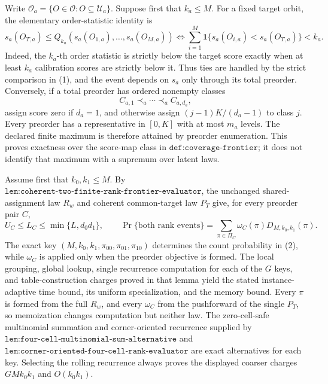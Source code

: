 Write \(\mathcal O_a=\{O\in\mathcal O:O\subseteq\mathcal U_a\}\). Suppose first that \(k_a\le M\). For a fixed target orbit, the elementary order-statistic identity is
\[
s_a(O_{T,a})
\le
Q_{k_a}(s_a(O_{1,a}),\ldots,s_a(O_{M,a}))
\Longleftrightarrow
\sum_{i=1}^M
\mathbf 1\{s_a(O_{i,a})<s_a(O_{T,a})\}
<k_a.
\tag{1}
\]
Indeed, the \(k_a\)-th order statistic is strictly below the target score exactly when at least \(k_a\) calibration scores are strictly below it. Thus ties are handled by the strict comparison in (1), and the event depends on \(s_a\) only through its total preorder. Conversely, if a total preorder has ordered nonempty classes
\[
C_{a,1}\prec_a\cdots\prec_a C_{a,d_a},
\]
assign score zero if \(d_a=1\), and otherwise assign \((j-1)K/(d_a-1)\) to class \(j\). Every preorder has a representative in \([0,K]\) with at most \(m_a\) levels. The declared finite maximum is therefore attained by preorder enumeration. This proves exactness over the score-map class in \(\texttt{def:coverage-frontier}\); it does not identify that maximum with a supremum over latent laws.

Assume first that \(k_0,k_1\le M\). By \(\texttt{lem:coherent-two-finite-rank-frontier-evaluator}\), the unchanged shared-assignment law \(R_w\) and coherent common-target law \(P_T\) give, for every preorder pair \(C\),
\[
U_C\le L_C\le\min\{L,d_0d_1\},
\qquad
\Pr\{\text{both rank events}\}
=
\sum_{\pi\in\Pi_C}
\omega_C(\pi)D_{M,k_0,k_1}(\pi).
\tag{2}
\]
The exact key \((M,k_0,k_1,\pi_{00},\pi_{01},\pi_{10})\) determines the count probability in (2), while \(\omega_C\) is applied only when the preorder objective is formed. The local grouping, global lookup, single recurrence computation for each of the \(G\) keys, and table-construction charges proved in that lemma yield the stated instance-adaptive time bound, its uniform specialization, and the memory bound. Every \(\pi\) is formed from the full \(R_w\), and every \(\omega_C\) from the pushforward of the single \(P_T\), so memoization changes computation but neither law. The zero-cell-safe multinomial summation and corner-oriented recurrence supplied by \(\texttt{lem:four-cell-multinomial-sum-alternative}\) and \(\texttt{lem:corner-oriented-four-cell-rank-evaluator}\) are exact alternatives for each key. Selecting the rolling recurrence always proves the displayed coarser charges \(GMk_0k_1\) and \(O(k_0k_1)\).

